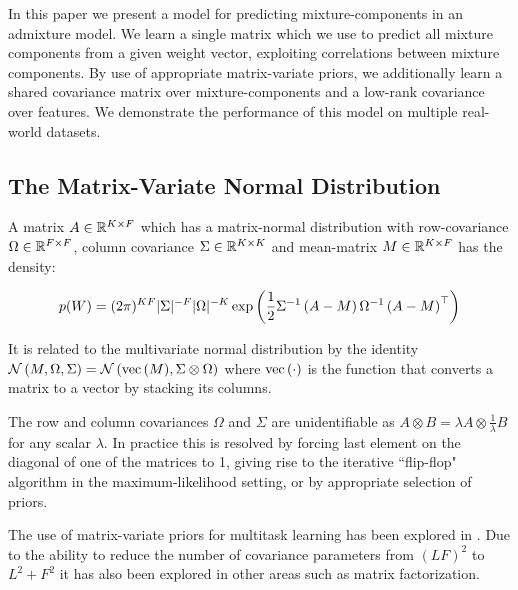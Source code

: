 In this paper we present a model for predicting mixture-components in an admixture model. We learn a single matrix which we use to predict all mixture components from a given weight vector, exploiting correlations between mixture components. By use of appropriate matrix-variate priors, we additionally learn a shared covariance matrix over mixture-components and a low-rank covariance over features. We demonstrate the performance of this model on multiple real-world datasets.

\subsection{The Matrix-Variate Normal Distribution}
A matrix $A \in { \mathbb{R}^{K \times F} }$ which has a matrix-normal distribution\cite{Gupta1999} with row-covariance $\Omega \in { \mathbb{R}^{F \times F} }$, column covariance $\Sigma \in { \mathbb{R}^{K \times K} }$ and mean-matrix $M \in { \mathbb{R}^{K \times F} }$ has the density:

\begin{equation}
p(W) = (2\pi)^{KF}|\Sigma|^{-F}|\Omega|^{-K} \exp\left(\frac{1}{2} {\Sigma}^{-1}\left(A - M\right) {\Omega}^{-1} \left(A - M \right)^\top\right)
\end{equation}

It is related to the multivariate normal distribution by the identity $\mathcal{N} \left(M, \Omega, \Sigma\right) = \mathcal{N} \left( {\text{vec}\left(M\right)}, {\Sigma \otimes \Omega} \right)$ where $\text{vec}\left(\cdot\right)$ is the function that converts a matrix to a vector by stacking its columns. 

The row and column covariances $\Omega$ and $\Sigma$ are unidentifiable as $ A \otimes B = \lambda A \otimes \frac{1}{\lambda}B$ for any scalar $\lambda$. In practice this is resolved by forcing last element on the diagonal of one of the matrices to 1, giving rise to the iterative ``flip-flop" algorithm \cite{Srivastava2009} in the maximum-likelihood setting, or by appropriate selection of priors\cite{Archambeau2011}\cite{Yang2011}.

The use of matrix-variate priors for multitask learning has been explored in \cite{Stegle2011}\cite{Bonilla2008} \cite{Archambeau2011}\cite{Yang2011}. Due to the ability to reduce the number of covariance parameters from $(LF)^2$ to $L^2 + F^2$ it has also been explored in other areas such as matrix factorization\cite{Allen2010}.

